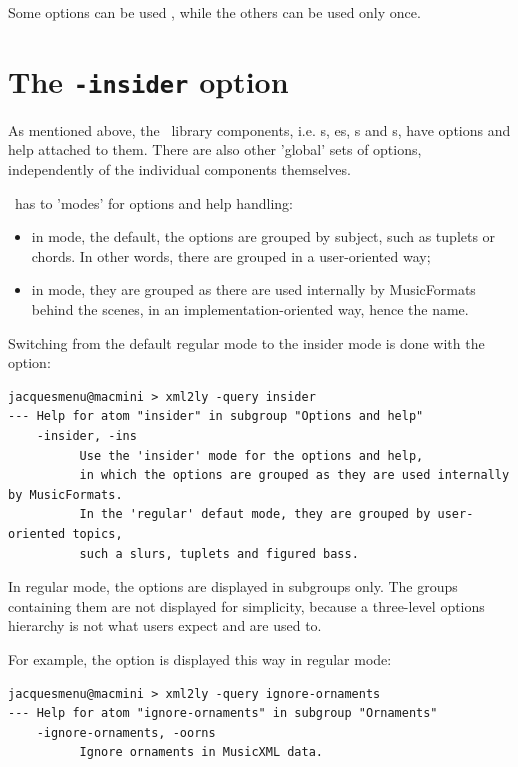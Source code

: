 Some options can be used , while the others can be used only once.

\section{The {\tt -insider} option}

As mentioned above, the \mf\ library components, i.e. \representation s, \pass es, \converter s and \generator s, have options and help attached to them. There are also other 'global' sets of options, independently of the individual components themselves.

\mf\ has to 'modes' for options and help handling:
\begin{itemize}
\item in  mode, the default, the options are grouped by subject, such as tuplets or chords. In other words, there are grouped in a user-oriented way;
\item in  mode, they are grouped as there are used internally by MusicFormats behind the scenes, in an implementation-oriented way, hence the name.
\end{itemize}

Switching from the default regular mode to the insider mode is done with the  option:
\begin{lstlisting}[language=Terminal]
jacquesmenu@macmini > xml2ly -query insider
--- Help for atom "insider" in subgroup "Options and help"
    -insider, -ins
          Use the 'insider' mode for the options and help,
          in which the options are grouped as they are used internally by MusicFormats.
          In the 'regular' defaut mode, they are grouped by user-oriented topics,
          such a slurs, tuplets and figured bass.
\end{lstlisting}

In regular mode, the options are displayed in subgroups only. The groups containing them are not displayed for simplicity, because a three-level options hierarchy is not what users expect and are used to.

For example, the  option is displayed this way in regular mode:
\begin{lstlisting}[language=Terminal]
jacquesmenu@macmini > xml2ly -query ignore-ornaments
--- Help for atom "ignore-ornaments" in subgroup "Ornaments"
    -ignore-ornaments, -oorns
          Ignore ornaments in MusicXML data.
\end{lstlisting}

